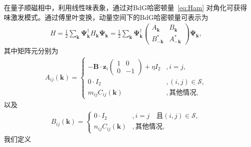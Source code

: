         在量子顺磁相中，利用线性味表象，通过对BdG哈密顿量~\eqref{eq:Ham} 对角化可获得味激发模式。通过傅里叶变换，动量空间下的BdG哈密顿量可表示为
        \begin{align}
            H=\frac{1}{2}\sum_{{\bm{k}}}\bm{\Psi}_{{\bm{k}}}^\dagger H_{{\bm{k}}}\bm{\Psi}_{{\bm{k}}}
            =\frac{1}{2}\sum_{{\bm{k}}}\bm{\Psi}_{{\bm{k}}}^\dagger 
            \begin{pmatrix}
                A_{{\bm{k}}}    & B_{{\bm{k}}}\\
                B^*_{-{\bm{k}}} & A^*_{-{\bm{k}}}
            \end{pmatrix}
            \bm{\Psi}_{{\bm{k}}},
        \end{align}
        其中矩阵元分别为
        \begin{align}
            A_{ij}({\bm{k}}) =
            \begin{cases}
            -\bm{B} \cdot \bm{z}_{i} 
            \begin{pmatrix}
            1 & 0\\
            0 & -1
            \end{pmatrix} 
            +\eta I_2  &,i=j,\\
            0 \cdot I_2  &, (i,j) \in \mathcal{S},\\
            m_{ij} C_{ij}({\bm{k}}) &,\text{其他情况},
            \end{cases}
        \end{align}
        以及
        \begin{align}
            B_{ij}({\bm{k}}) =
            \begin{cases}
            0 \cdot I_{2} & ,i=j\quad \text{且} (i,j) \in \mathcal{S},\\
            n_{ij} C_{ij}({\bm{k}}) & ,\text{其他情况},
            \end{cases}
        \end{align}
        我们定义
